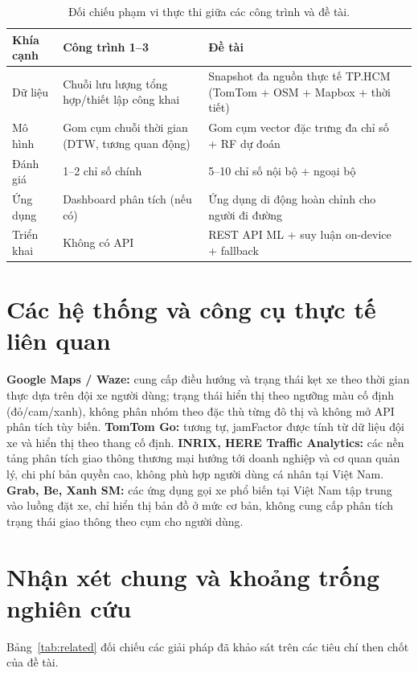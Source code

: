 \begin{table}[h!]
\centering
\caption{Đối chiếu phạm vi thực thi giữa các công trình và đề tài.}
\label{tab:gap}
\small
\begin{tabularx}{\textwidth}{lXXX}
\toprule
\textbf{Khía cạnh} & \textbf{Công trình 1--3} & \textbf{Đề tài}\\
\midrule
Dữ liệu & Chuỗi lưu lượng tổng hợp/thiết lập công khai & Snapshot đa nguồn thực tế TP.HCM (TomTom + OSM + Mapbox + thời tiết)\\
Mô hình & Gom cụm chuỗi thời gian (DTW, tương quan động) & Gom cụm vector đặc trưng đa chỉ số + RF dự đoán\\
Đánh giá & 1--2 chỉ số chính & 5--10 chỉ số nội bộ + ngoại bộ\\
Ứng dụng & Dashboard phân tích (nếu có) & Ứng dụng di động hoàn chỉnh cho người đi đường\\
Triển khai & Không có API & REST API ML + suy luận on-device + fallback\\
\bottomrule
\end{tabularx}
\end{table}

\section{Các hệ thống và công cụ thực tế liên quan}
\textbf{Google Maps / Waze:} cung cấp điều hướng và trạng thái kẹt xe theo thời gian thực dựa trên đội xe người dùng; trạng thái hiển thị theo ngưỡng màu cố định (đỏ/cam/xanh), không phân nhóm theo đặc thù từng đô thị và không mở API phân tích tùy biến. \textbf{TomTom Go:} tương tự, jamFactor được tính từ dữ liệu đội xe và hiển thị theo thang cố định. \textbf{INRIX, HERE Traffic Analytics:} các nền tảng phân tích giao thông thương mại hướng tới doanh nghiệp và cơ quan quản lý, chi phí bản quyền cao, không phù hợp người dùng cá nhân tại Việt Nam. \textbf{Grab, Be, Xanh SM:} các ứng dụng gọi xe phổ biến tại Việt Nam tập trung vào luồng đặt xe, chỉ hiển thị bản đồ ở mức cơ bản, không cung cấp phân tích trạng thái giao thông theo cụm cho người dùng.

\section{Nhận xét chung và khoảng trống nghiên cứu}
Bảng~\ref{tab:related} đối chiếu các giải pháp đã khảo sát trên các tiêu chí then chốt của đề tài.

